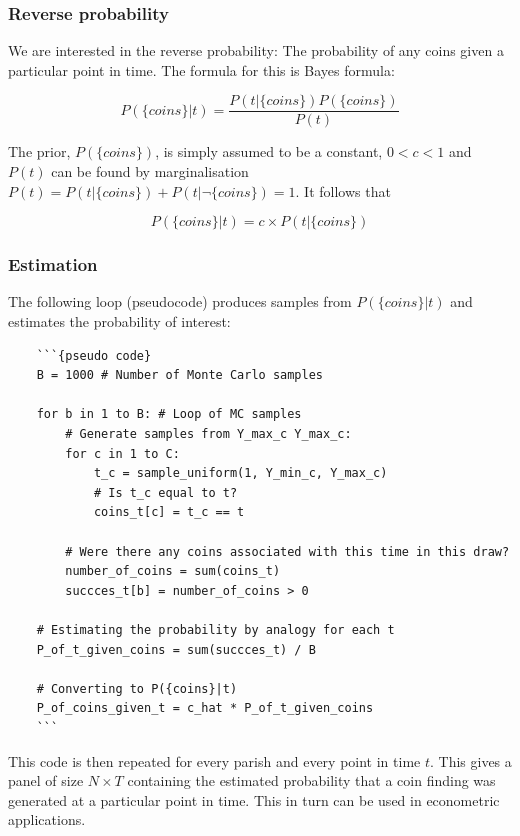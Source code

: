 \subsubsection{Reverse probability} 
We are interested in the reverse probability: The probability of any coins given a particular point in time. The formula for this is Bayes formula:

\begin{equation}
P(\{coins\}|t) = \frac{P(t|\{coins\})P(\{coins\})}{P(t)}
\end{equation}

The prior, $P(\{coins\})$, is simply assumed to be a constant, $0<c<1$ and $P(t)$ can be found by marginalisation  $P(t)=P(t|\{coins\})+P(t|\neg\{coins\})=1$. It follows that

\begin{equation}
P(\{coins\}|t) = c\times P(t|\{coins\})
\end{equation}

\subsubsection{Estimation}
The following loop (pseudocode) produces samples from $P(\{coins\}|t)$ and estimates the probability of interest:

\begin{verbatim}
    ```{pseudo code}
    B = 1000 # Number of Monte Carlo samples
    
    for b in 1 to B: # Loop of MC samples
    	# Generate samples from Y_max_c Y_max_c:
    	for c in 1 to C:
    		t_c = sample_uniform(1, Y_min_c, Y_max_c)
    		# Is t_c equal to t?
    		coins_t[c] = t_c == t
    		
    	# Were there any coins associated with this time in this draw?
    	number_of_coins = sum(coins_t)
    	succces_t[b] = number_of_coins > 0
    	
    # Estimating the probability by analogy for each t
    P_of_t_given_coins = sum(succces_t) / B
    
    # Converting to P({coins}|t)
    P_of_coins_given_t = c_hat * P_of_t_given_coins
    ```
\end{verbatim}



This code is then repeated for every parish and every point in time $t$. This gives a panel of size $N\times T$ containing the estimated probability that a coin finding was generated at a particular point in time. This in turn can be used in econometric applications. 

